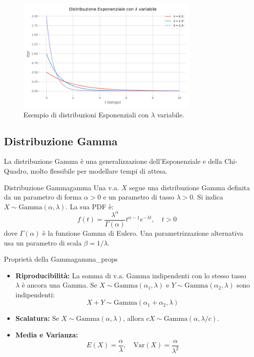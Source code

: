 \begin{figure}[H]
    \centering
    \includegraphics[width=0.8\textwidth]{images/th_01_03/esponenziale.png}
    \caption{Esempio di distribuzioni Esponenziali con \(\lambda\) variabile.}
    \label{fig:esponenziale}
\end{figure}

\subsection{Distribuzione Gamma}
La distribuzione Gamma è una generalizzazione dell'Esponenziale e della Chi-Quadro, molto flessibile per modellare tempi di attesa.

\begin{definizione}{Distribuzione Gamma}{gamma}
Una v.a. \(X\) segue una distribuzione Gamma definita da un parametro di forma \(\alpha>0\) e un parametro di tasso \(\lambda>0\). Si indica \(X \sim \text{Gamma}(\alpha, \lambda)\). La sua PDF è:
\[
f(t) = \frac{\lambda^\alpha}{\Gamma(\alpha)} t^{\alpha-1} e^{-\lambda t}, \quad t>0
\]
dove \(\Gamma(\alpha)\) è la funzione Gamma di Eulero. Una parametrizzazione alternativa usa un parametro di scala \(\beta = 1/\lambda\).
\end{definizione}

\begin{proposizione}{Proprietà della Gamma}{gamma_props}
\begin{itemize}
    \item \textbf{Riproducibilità:} La somma di v.a. Gamma indipendenti con lo stesso tasso \(\lambda\) è ancora una Gamma. Se \(X \sim \text{Gamma}(\alpha_1, \lambda)\) e \(Y \sim \text{Gamma}(\alpha_2, \lambda)\) sono indipendenti:
    \[ X+Y \sim \text{Gamma}(\alpha_1+\alpha_2, \lambda) \]
    \item \textbf{Scalatura:} Se \(X \sim \text{Gamma}(\alpha, \lambda)\), allora \(cX \sim \text{Gamma}(\alpha, \lambda/c)\).
    \item \textbf{Media e Varianza:}
    \[ E(X) = \frac{\alpha}{\lambda}, \quad \text{Var}(X) = \frac{\alpha}{\lambda^2} \]
\end{itemize}
\end{proposizione}

